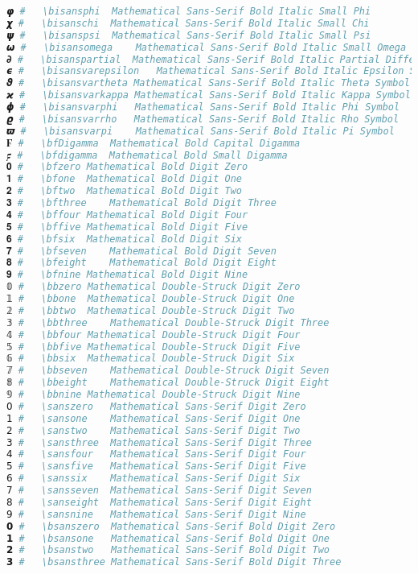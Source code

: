 \begin{lstlisting}[language=Julia, style=julia]
𝞿 #   \bisansphi  Mathematical Sans-Serif Bold Italic Small Phi
𝟀 #   \bisanschi  Mathematical Sans-Serif Bold Italic Small Chi
𝟁 #   \bisanspsi  Mathematical Sans-Serif Bold Italic Small Psi
𝟂 #   \bisansomega    Mathematical Sans-Serif Bold Italic Small Omega
𝟃 #   \bisanspartial  Mathematical Sans-Serif Bold Italic Partial Differential
𝟄 #   \bisansvarepsilon   Mathematical Sans-Serif Bold Italic Epsilon Symbol
𝟅 #   \bisansvartheta Mathematical Sans-Serif Bold Italic Theta Symbol
𝟆 #   \bisansvarkappa Mathematical Sans-Serif Bold Italic Kappa Symbol
𝟇 #   \bisansvarphi   Mathematical Sans-Serif Bold Italic Phi Symbol
𝟈 #   \bisansvarrho   Mathematical Sans-Serif Bold Italic Rho Symbol
𝟉 #   \bisansvarpi    Mathematical Sans-Serif Bold Italic Pi Symbol
𝟊 #   \bfDigamma  Mathematical Bold Capital Digamma
𝟋 #   \bfdigamma  Mathematical Bold Small Digamma
𝟎 #   \bfzero Mathematical Bold Digit Zero
𝟏 #   \bfone  Mathematical Bold Digit One
𝟐 #   \bftwo  Mathematical Bold Digit Two
𝟑 #   \bfthree    Mathematical Bold Digit Three
𝟒 #   \bffour Mathematical Bold Digit Four
𝟓 #   \bffive Mathematical Bold Digit Five
𝟔 #   \bfsix  Mathematical Bold Digit Six
𝟕 #   \bfseven    Mathematical Bold Digit Seven
𝟖 #   \bfeight    Mathematical Bold Digit Eight
𝟗 #   \bfnine Mathematical Bold Digit Nine
𝟘 #   \bbzero Mathematical Double-Struck Digit Zero
𝟙 #   \bbone  Mathematical Double-Struck Digit One
𝟚 #   \bbtwo  Mathematical Double-Struck Digit Two
𝟛 #   \bbthree    Mathematical Double-Struck Digit Three
𝟜 #   \bbfour Mathematical Double-Struck Digit Four
𝟝 #   \bbfive Mathematical Double-Struck Digit Five
𝟞 #   \bbsix  Mathematical Double-Struck Digit Six
𝟟 #   \bbseven    Mathematical Double-Struck Digit Seven
𝟠 #   \bbeight    Mathematical Double-Struck Digit Eight
𝟡 #   \bbnine Mathematical Double-Struck Digit Nine
𝟢 #   \sanszero   Mathematical Sans-Serif Digit Zero
𝟣 #   \sansone    Mathematical Sans-Serif Digit One
𝟤 #   \sanstwo    Mathematical Sans-Serif Digit Two
𝟥 #   \sansthree  Mathematical Sans-Serif Digit Three
𝟦 #   \sansfour   Mathematical Sans-Serif Digit Four
𝟧 #   \sansfive   Mathematical Sans-Serif Digit Five
𝟨 #   \sanssix    Mathematical Sans-Serif Digit Six
𝟩 #   \sansseven  Mathematical Sans-Serif Digit Seven
𝟪 #   \sanseight  Mathematical Sans-Serif Digit Eight
𝟫 #   \sansnine   Mathematical Sans-Serif Digit Nine
𝟬 #   \bsanszero  Mathematical Sans-Serif Bold Digit Zero
𝟭 #   \bsansone   Mathematical Sans-Serif Bold Digit One
𝟮 #   \bsanstwo   Mathematical Sans-Serif Bold Digit Two
𝟯 #   \bsansthree Mathematical Sans-Serif Bold Digit Three

\end{lstlisting}
